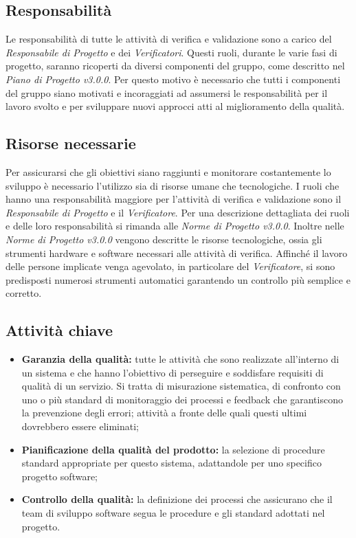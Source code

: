 \subsection{Responsabilità}
Le responsabilità di tutte le attività di verifica e validazione sono a carico del \textit{Responsabile di Progetto} e dei \textit{Verificatori}. Questi ruoli, durante le varie fasi di progetto, saranno ricoperti da diversi componenti del gruppo, come descritto nel \textit{Piano di Progetto v3.0.0}. Per questo motivo è necessario che tutti i componenti del gruppo siano motivati e incoraggiati ad assumersi le responsabilità per il lavoro svolto e per sviluppare nuovi approcci atti al miglioramento della qualità.

\subsection{Risorse necessarie}
Per assicurarsi che gli obiettivi siano raggiunti e monitorare costantemente lo sviluppo è necessario l'utilizzo sia di risorse umane che tecnologiche. I ruoli che hanno una responsabilità maggiore per l'attività di verifica e validazione sono il \textit{Responsabile di Progetto} e il \textit{Verificatore}. Per una descrizione dettagliata dei ruoli e delle loro responsabilità si rimanda alle \textit{Norme di Progetto v3.0.0}. Inoltre nelle \textit{Norme di Progetto v3.0.0} vengono descritte le risorse tecnologiche, ossia gli strumenti hardware e software necessari alle attività di verifica. Affinché il lavoro delle persone implicate venga agevolato, in particolare del \textit{Verificatore}, si sono predisposti numerosi strumenti automatici garantendo un controllo più semplice e corretto.

\subsection{Attività chiave}
\begin{itemize}
	\item \textbf{Garanzia della qualità:} tutte le attività che sono realizzate all'interno di un sistema e che hanno l'obiettivo di perseguire e soddisfare requisiti di qualità di un servizio. Si tratta di misurazione sistematica, di confronto con uno o più standard di monitoraggio dei processi e \gls{feedback} che garantiscono la prevenzione degli errori; attività a fronte delle quali questi ultimi dovrebbero essere eliminati;
	\item \textbf{Pianificazione della qualità del prodotto:} la selezione di procedure standard appropriate per questo sistema, adattandole per uno specifico progetto software;
	\item \textbf{Controllo della qualità:} la definizione dei processi che assicurano che il team  di sviluppo software segua le procedure e gli standard adottati nel progetto.
\end{itemize}
	
